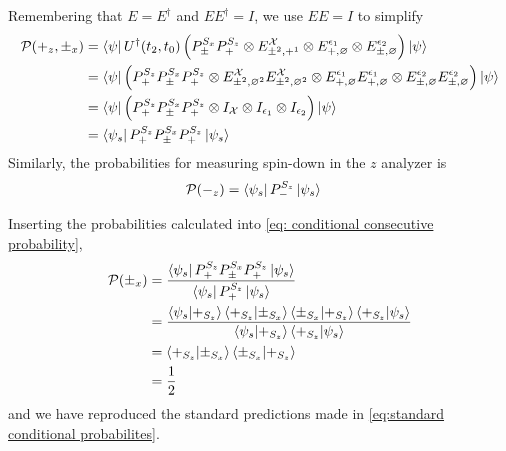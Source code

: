 Remembering that $E = E^\dagger$ and $EE^\dagger = I$, we use $EE = I$ to simplify
\begin{align}
  \mathcal{P}(+_z, \pm_x) &= \bra{\psi}  U^\dagger(t_2, t_0) \left(P^{S_x}_\pm P^{S_z}_+ \otimes E^\mathcal{X}_{\pm^2, +^1} \otimes E^{\epsilon_1}_{+, \varnothing} \otimes E^{\epsilon_2}_{\pm, \varnothing} \right) \ket{\psi} \\ \nonumber
  &= \bra{\psi} \left(P^{S_z}_+ P^{S_x}_\pm P^{S_z}_+ \otimes E^\mathcal{X}_{\pm^2, \varnothing^2}E^\mathcal{X}_{\pm^2, \varnothing^2} \otimes E^{\epsilon_1}_{+, \varnothing} E^{\epsilon_1}_{+, \varnothing} \otimes E^{\epsilon_2}_{\pm, \varnothing} E^{\epsilon_2}_{\pm, \varnothing} \right) \ket{\psi} \\ \nonumber
  &= \bra{\psi} \left(P^{S_z}_+ P^{S_x}_\pm P^{S_z}_+ \otimes I_\mathcal{X}  \otimes I_{\epsilon_1} \otimes I_{\epsilon_2} \right) \ket{\psi} \\ \nonumber
  &= \bra{\psi_s} P^{S_z}_+ P^{S_x}_\pm P^{S_z}_+ \ket{\psi_s}
\end{align}
Similarly, the probabilities for measuring spin-down in the $z$ analyzer is
\begin{align}
  \mathcal{P}(-_z) &= \bra{\psi_s} P^{S_z}_- \ket{\psi_s}
\end{align}

Inserting the probabilities calculated into \autoref{eq: conditional consecutive probability},
\begin{align}
    \mathcal{P}(\pm_x) &= \frac{\bra{\psi_s} P^{S_z}_+ P^{S_x}_\pm P^{S_z}_+ \ket{\psi_s}}{\bra{\psi_s} P^{S_z}_+ \ket{\psi_s}} \\ \nonumber
    &= \frac{\braket{\psi_s | +_{S_z}} \braket{+_{S_z}|\pm_{S_x}} \braket{\pm_{S_x}|+_{S_z}} \braket{+_{S_z}|\psi_s}}{\braket{\psi_s | +_{S_z}} \braket{+_{S_z}|\psi_s}} \\ \nonumber
    &= \braket{+_{S_z}|\pm_{S_x}} \braket{\pm_{S_x}|+_{S_z}} \\ \nonumber
    &= \frac{1}{2}
\end{align}
and we have reproduced the standard predictions made in \autoref{eq:standard conditional probabilites}.

